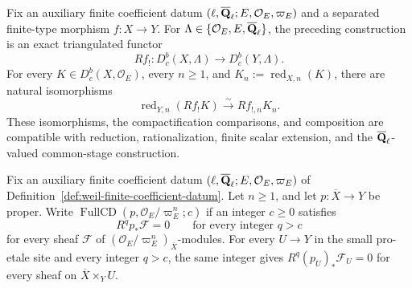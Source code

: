 \begin{proposition}
\label{prop:compact-support-coefficient-passage}


Fix an auxiliary finite coefficient datum
\((\ell,\overline{\mathbf Q}_\ell;E,\mathcal O_E,\varpi_E)\) and a separated finite-type
morphism \(f:X\to Y\).  For
\(\Lambda\in\{\mathcal O_E,E,\overline{\mathbf Q}_\ell\}\), the preceding construction is
an exact triangulated functor
\[
 Rf_!:D^b_c(X,\Lambda)\longrightarrow D^b_c(Y,\Lambda).
\]
For every \(K\in D^b_c(X,\mathcal O_E)\), every \(n\geq1\), and
\(K_n:=\operatorname{red}_{X,n}(K)\), there are natural isomorphisms
\[
 \operatorname{red}_{Y,n}(Rf_!K)
 \xrightarrow{\sim}Rf_{!,n}K_n.
\]
These isomorphisms, the compactification comparisons, and composition are
compatible with reduction, rationalization, finite scalar extension, and
the \(\overline{\mathbf Q}_\ell\)-valued common-stage construction.
\end{proposition}



\begin{definition}
\label{def:full-cohomological-dimension}


Fix an auxiliary finite coefficient datum
\((\ell,\overline{\mathbf Q}_\ell;E,\mathcal O_E,\varpi_E)\) of
Definition~\ref{def:weil-finite-coefficient-datum}.  Let \(n\geq1\), and
let \(p:\overline X\to Y\) be proper.  Write
\(\operatorname{FullCD}(p,\mathcal O_E/\varpi_E^n;c)\) if an integer
\(c\geq0\) satisfies
\[
 R^qp_*\mathcal F=0\qquad\text{for every integer }q>c
\]
for every sheaf \(\mathcal F\) of
\((\mathcal O_E/\varpi_E^n)_{\overline X}\)-modules.  For every
\(U\to Y\) in the small pro-etale site and every integer \(q>c\), the same
integer gives \(R^q(p_U)_*\mathcal F_U=0\) for every sheaf on
\(\overline X\times_YU\).
\end{definition}


